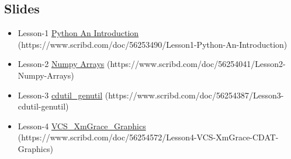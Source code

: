\documentclass[letterpaper,10pt,english]{sphinxmanual}
\begin{document}
\subsection{Slides}
\label{getting_started:slides}\begin{itemize}
\item {} 
Lesson-1 \href{https://www.scribd.com/doc/56253490/Lesson1-Python-An-Introduction}{Python An Introduction} (https://www.scribd.com/doc/56253490/Lesson1-Python-An-Introduction)

\item {} 
Lesson-2 \href{https://www.scribd.com/doc/56254041/Lesson2-Numpy-Arrays}{Numpy Arrays} (https://www.scribd.com/doc/56254041/Lesson2-Numpy-Arrays)

\item {} 
Lesson-3 \href{https://www.scribd.com/doc/56254387/Lesson3-cdutil-genutil}{cdutil\_genutil} (https://www.scribd.com/doc/56254387/Lesson3-cdutil-genutil)

\item {} 
Lesson-4 \href{https://www.scribd.com/doc/56254572/Lesson4-VCS-XmGrace-CDAT-Graphics}{VCS\_XmGrace\_Graphics} (https://www.scribd.com/doc/56254572/Lesson4-VCS-XmGrace-CDAT-Graphics)

\end{itemize}
\end{document}
